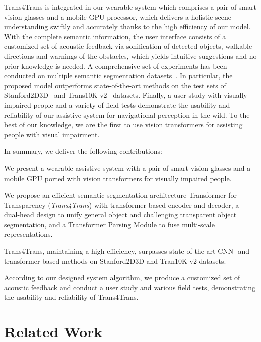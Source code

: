 \documentclass[10pt,twocolumn,letterpaper]{article}
\begin{document}
Trans4Trans is integrated in our wearable system which comprises a pair of smart vision glasses and a mobile GPU processor, which delivers a holistic scene understanding swiftly and accurately thanks to the high efficiency of our model. 
With the complete semantic information, the user interface consists of a customized set of acoustic feedback via sonification of detected objects, walkable directions and warnings of the obstacles, which yields intuitive suggestions and no prior knowledge is needed.
A comprehensive set of experiments has been conducted on multiple semantic segmentation datasets~\cite{stanford2d3d,xie2021segmenting}. In particular, the proposed model outperforms state-of-the-art methods on the test sets of Stanford2D3D~\cite{stanford2d3d} and Trans10K-v2~\cite{xie2021segmenting} datasets. Finally, a user study with visually impaired people and a variety of field tests demonstrate the usability and reliability of our assistive system for navigational perception in the wild. To the best of our knowledge, we are the first to use vision transformers for assisting people with visual impairment.

In summary, we deliver the following contributions:
\begin{compactitem}
    \item We present a wearable assistive system with a pair of smart vision glasses and a mobile GPU ported with vision transformers for visually impaired people.
    \item We propose an efficient semantic segmentation architecture Transformer for Transparency (\emph{Trans4Trans}) with transformer-based encoder and decoder, a dual-head design to unify general object and challenging transparent object segmentation, and a Transformer Parsing Module to fuse multi-scale representations.
    \item Trans4Trans, maintaining a high efficiency, surpasses state-of-the-art CNN- and transformer-based methods on Stanford2D3D and Tran10K-v2 datasets.
    \item According to our designed system algorithm, we produce a customized set of acoustic feedback and conduct a user study and various field tests, demonstrating the usability and reliability of Trans4Trans. 
\end{compactitem}

\section{Related Work}
\end{document}
